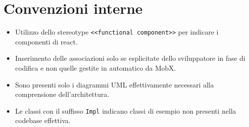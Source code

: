 \section{Convenzioni interne}
\begin{itemize}
    \item Utilizzo dello stereotype \texttt{<<functional component>>} per indicare i componenti di react.
    \item Inserimento delle associazioni solo se esplicitate dello sviluppatore in fase di codifica e non quelle gestite in automatico da MobX.
    \item Sono presenti solo i diagrammi UML effettivamente necessari alla comprensione dell'architettura.
    \item Le classi con il suffisso \texttt{Impl} indicano classi di esempio non presenti nella codebase effettiva.
\end{itemize}
